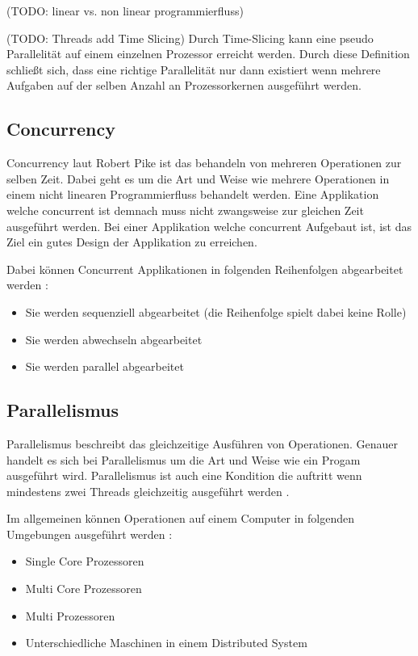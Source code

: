 (TODO: linear vs. non linear programmierfluss)

(TODO: Threads add Time Slicing)
Durch Time-Slicing kann eine pseudo Parallelität auf einem einzelnen Prozessor erreicht werden. Durch diese Definition schließt sich, dass eine richtige Parallelität nur dann existiert wenn mehrere Aufgaben auf der selben Anzahl an Prozessorkernen ausgeführt werden. 







\subsection{Concurrency}
\label{section:concurrency}

Concurrency laut Robert Pike ist das behandeln von mehreren Operationen zur selben Zeit. Dabei geht es um die Art und Weise wie mehrere Operationen in einem nicht linearen Programmierfluss behandelt werden. Eine Applikation welche concurrent ist demnach muss nicht zwangsweise zur gleichen Zeit ausgeführt werden. Bei einer Applikation welche concurrent Aufgebaut ist, ist das Ziel ein gutes Design der Applikation zu erreichen. \cite[]{Pik2013}

Dabei können Concurrent Applikationen in folgenden Reihenfolgen abgearbeitet werden \cite[p. 14]{Erb2012}:

\begin{itemize}
  \item Sie werden sequenziell abgearbeitet (die Reihenfolge spielt dabei keine Rolle)
  \item Sie werden abwechseln abgearbeitet
  \item Sie werden parallel abgearbeitet
\end{itemize}

\subsection{Parallelismus}
Parallelismus beschreibt das gleichzeitige Ausführen von Operationen. Genauer handelt es sich bei Parallelismus um die Art und Weise wie ein Progam ausgeführt wird. Parallelismus ist auch eine Kondition die auftritt wenn mindestens zwei Threads gleichzeitig ausgeführt werden \cite[]{oracle:multithreading}.

Im allgemeinen können Operationen auf einem Computer in folgenden Umgebungen ausgeführt werden \cite[p. 14]{Erb2012}:

\begin{itemize}
  \item Single Core Prozessoren
  \item Multi Core Prozessoren
  \item Multi Prozessoren
  \item Unterschiedliche Maschinen in einem Distributed System
\end{itemize}

